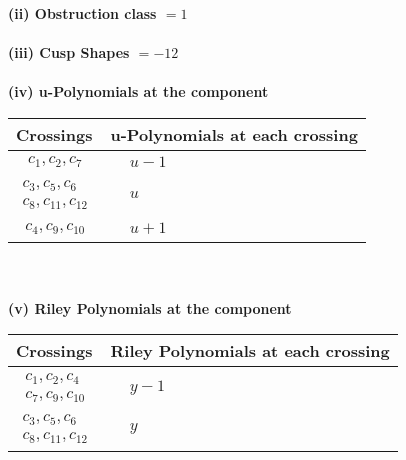 \documentclass[1p]{elsarticle_modified}
\theoremstyle{definition}
\begin{document}
\flushleft \textbf{(ii) Obstruction class $= 1$}\\~\\
\flushleft \textbf{(iii) Cusp Shapes $= -12$}\\~\\
\newpage\renewcommand{\arraystretch}{1}
\flushleft \textbf{(iv) u-Polynomials at the component}\newline \\
\begin{tabular}{m{50pt}|m{274pt}}
Crossings & \hspace{64pt}u-Polynomials at each crossing \\
\hline $$\begin{aligned}c_{1},c_{2},c_{7}\end{aligned}$$&$\begin{aligned}
&u-1
\end{aligned}$\\
\hline $$\begin{aligned}c_{3},c_{5},c_{6}\\c_{8},c_{11},c_{12}\end{aligned}$$&$\begin{aligned}
&u
\end{aligned}$\\
\hline $$\begin{aligned}c_{4},c_{9},c_{10}\end{aligned}$$&$\begin{aligned}
&u+1
\end{aligned}$\\
\hline
\end{tabular}\\~\\
\newpage\renewcommand{\arraystretch}{1}
\flushleft \textbf{(v) Riley Polynomials at the component}\newline \\
\begin{tabular}{m{50pt}|m{274pt}}
Crossings & \hspace{64pt}Riley Polynomials at each crossing \\
\hline $$\begin{aligned}c_{1},c_{2},c_{4}\\c_{7},c_{9},c_{10}\end{aligned}$$&$\begin{aligned}
&y-1
\end{aligned}$\\
\hline $$\begin{aligned}c_{3},c_{5},c_{6}\\c_{8},c_{11},c_{12}\end{aligned}$$&$\begin{aligned}
&y
\end{aligned}$\\
\hline
\end{tabular}\\~\\
\end{document}

